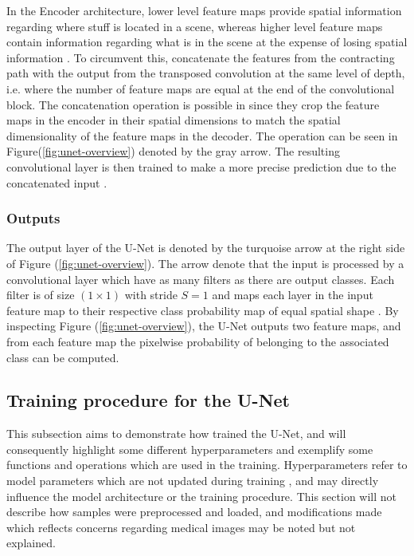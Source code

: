 \documentclass[../main/thesis.tex]{subfiles}
\begin{document}
In the Encoder architecture, lower level feature maps provide spatial information regarding where stuff is located in a scene, whereas higher level feature maps contain information regarding what is in the scene at the expense of losing spatial information \citep{Long2015}. To circumvent this, \citet{Ronneberger2015} concatenate the features from the contracting path with the output from the transposed convolution at the same level of depth, i.e. where the number of feature maps are equal at the end of the convolutional block. The concatenation operation is possible in \citet{Ronneberger2015} since they crop the feature maps in the encoder in their spatial dimensions to match the spatial dimensionality of the feature maps in the decoder. The operation can be seen in Figure(\ref{fig:unet-overview}) denoted by the gray arrow. The resulting convolutional layer is then trained to make a more precise prediction due to the concatenated input \citep{Ronneberger2015}.

\subsubsection{Outputs}
The output layer of the U-Net is denoted by the turquoise arrow at the right side of Figure (\ref{fig:unet-overview}). The arrow denote that the input is processed by a convolutional layer which have as many filters as there are output classes. Each filter is of size $(1 \times 1)$ with stride $S=1$ and maps each layer in the input feature map to their respective class probability map of equal spatial shape \citep{Ronneberger2015}. By inspecting Figure (\ref{fig:unet-overview}), the U-Net outputs two feature maps, and from each feature map the pixelwise probability of belonging to the associated class can be computed.

\subsection{Training procedure for the U-Net}
\label{sec:training-loop}
This subsection aims to demonstrate how \citet{Ronneberger2015} trained the U-Net, and will consequently highlight some different hyperparameters and exemplify some functions and operations which are used in the training. Hyperparameters refer to model parameters which are not updated during training \citep{Yu2020a}, and may directly influence the model architecture or the training procedure. This section will not describe how samples were preprocessed and loaded, and modifications made which reflects concerns regarding medical images may be noted but not explained.
\end{document}
